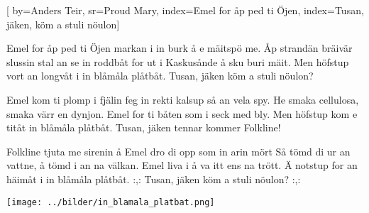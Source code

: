

[ 		%
	by={Anders Teir},					%
	sr={Proud Mary},					%
	index={Emel for åp ped ti Öjen}, 						%
	index={Tusan, jäken, köm a stuli nöulon}]						%
	

\beginverse*						%
Emel for åp ped ti Öjen
markan i in burk å e mäitspö me.
Åp strandän bräivär slussin
stal an se in roddbåt
for ut i Kaskusånde å sku buri mäit.
Men höfstup vort an longvåt
i in blåmåla plåtbåt.
Tusan, jäken
köm a stuli nöulon?
\endverse							%

\beginverse*						%
Emel kom ti plomp i fjälin
feg in rekti kalsup så an vela spy.
He smaka cellulosa,
smaka värr en dynjon.
Emel for ti båten som i seck med bly.
Men höfstup kom e titåt
in blåmåla plåtbåt.
Tusan, jäken
tennar kommer Folkline!
\endverse							%

\beginverse*						%
Folkline tjuta me sirenin
å Emel dro di opp som in arin mört
Så tömd di ur an vattne,
å tömd i an na välkan.
Emel liva i å va itt ens na trött.
Ä notstup for an häimåt
i in blåmåla plåtbåt.
:,: Tusan, jäken
köm a stuli nöulon? :,:
\endverse							%
\endsong							%

\begin{intersong}
\texttt{[image: ../bilder/in\_blamala\_platbat.png]} 
\end{intersong}
